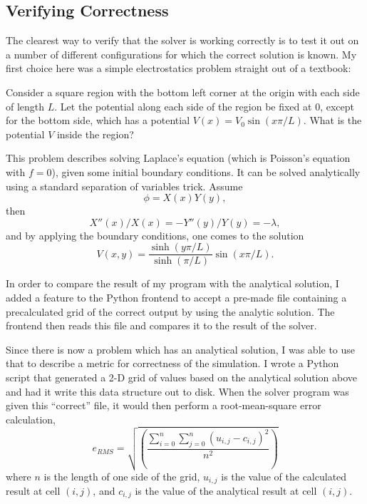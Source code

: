 \subsection{Verifying Correctness}

The clearest way to verify that the solver is working correctly is to test it out on a number of different configurations
for which the correct solution is known. My first choice here was a simple electrostatics problem straight out of a textbook\cite{griffiths}:

\begin{addmargin}[2em]{2em}%
	Consider a square region with the bottom left corner at the origin with each side of length $L$. Let the potential
	along each side of the region be fixed at 0, except for the bottom side, which has a potential $V(x) = V_0 \sin(x \pi / L)$.
	What is the potential $V$ inside the region?
\end{addmargin}

This problem describes solving Laplace's equation (which is Poisson's equation with $f=0$), given some initial boundary conditions.
It can be solved analytically using a standard separation of variables trick\cite{boas}. Assume
$$\phi = X(x) Y(y),$$
then
$$X''(x)/X(x) = -Y''(y)/Y(y) = -\lambda,$$
and by applying the boundary conditions, one comes to the solution\cite{griffiths}
$$V(x,y) = \frac{\sinh(y \pi / L)}{\sinh(\pi / L)} \sin(x \pi / L).$$

In order to compare the result of my program with the analytical solution, I added a feature to the Python frontend
to accept a pre-made file containing a precalculated grid of the correct output by using the analytic solution. The
frontend then reads this file and compares it to the result of the solver.

Since there is now a problem which has an analytical solution, I was able to use that to describe a metric for
correctness of the simulation. I wrote a Python script that generated a 2-D grid of values based on the analytical
solution above and had it write this data structure out to disk. When the solver program was given this ``correct''
file, it would then perform a root-mean-square error calculation,
$$e_{RMS} = \sqrt{\left(\frac{\sum_{i=0}^{n} \sum_{j=0}^{n} (u_{i,j} - c_{i,j})^2}{n^2}\right)}$$
where $n$ is the length of one side of the grid, $u_{i,j}$ is the value of the calculated result at cell $(i,j)$, and
$c_{i, j}$ is the value of the analytical result at cell $(i, j)$.

